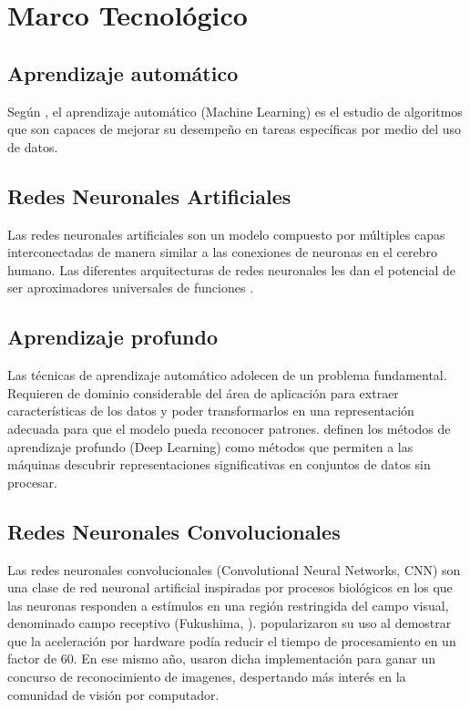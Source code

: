 \section{Marco Tecnológico}

\subsection{Aprendizaje automático}

Según \cite{mitchell1997machine}, el aprendizaje automático (Machine Learning) 
es el estudio de algoritmos que son capaces de mejorar su desempeño en tareas 
específicas por medio del uso de datos.

\subsection{Redes Neuronales Artificiales}

Las redes neuronales artificiales son un modelo compuesto por múltiples capas 
interconectadas de manera similar a las conexiones de neuronas en el cerebro 
humano. Las diferentes arquitecturas de redes neuronales les dan el potencial 
de ser aproximadores universales de funciones \cite{braspenning1995artificial}. 

\subsection{Aprendizaje profundo}

Las técnicas de aprendizaje automático adolecen de un problema fundamental. 
Requieren de dominio considerable del área de aplicación para extraer 
características de los datos y poder transformarlos en una representación 
adecuada para que el modelo pueda reconocer patrones. \cite{LeCun2015} definen
los métodos de aprendizaje profundo (Deep Learning) como métodos que permiten a 
las máquinas descubrir representaciones significativas en conjuntos de datos 
sin procesar.


\subsection{Redes Neuronales Convolucionales}

Las redes neuronales convolucionales (Convolutional Neural Networks, CNN) son 
una clase de red neuronal artificial inspiradas por procesos biológicos en los 
que las neuronas responden a estímulos en una región restringida del campo 
visual, denominado campo receptivo (Fukushima, \citeyear{Fukushima1980}). 
\cite{Ciresan2011FlexibleHP} popularizaron su uso al demostrar que la 
aceleración por hardware podía reducir el tiempo de procesamiento en un factor 
de 60. En ese mismo año, usaron dicha implementación para ganar un concurso de 
reconocimiento de imagenes, despertando más interés en la comunidad de visión 
por computador.


